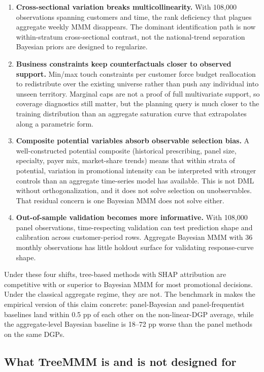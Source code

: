 \documentclass[review,12pt]{elsarticle}
\begin{document}
\begin{enumerate}
\item \textbf{Cross-sectional variation breaks multicollinearity.} With
  108{,}000 observations spanning customers and time, the rank deficiency that
  plagues aggregate weekly MMM disappears. The dominant identification path is
  now within-stratum cross-sectional contrast, not the national-trend separation
  Bayesian priors are designed to regularize.
\item \textbf{Business constraints keep counterfactuals closer to observed support.}
  Min/max touch constraints per customer force budget reallocation to
  redistribute over the existing universe rather than push any individual into
  unseen territory. Marginal caps are not a proof of full multivariate support,
  so coverage diagnostics still matter, but the planning query is much closer
  to the training distribution than an aggregate saturation curve that
  extrapolates along a parametric form.
\item \textbf{Composite potential variables absorb observable selection bias.}
  A well-constructed potential composite (historical prescribing, panel size,
  specialty, payer mix, market-share trends) means that within strata of
  potential, variation in promotional intensity can be interpreted with
  stronger controls than an aggregate time-series model has available. This is
  not DML without orthogonalization, and it does not solve selection on
  unobservables. That residual concern is one Bayesian MMM does not solve
  either.
\item \textbf{Out-of-sample validation becomes more informative.} With
  108{,}000 panel observations, time-respecting validation can test prediction
  shape and calibration across customer-period rows. Aggregate Bayesian MMM
  with 36 monthly observations has little holdout surface for validating
  response-curve shape.
\end{enumerate}

Under these four shifts, tree-based methods with SHAP attribution are
competitive with or superior to Bayesian MMM for most promotional decisions.
Under the classical aggregate regime, they are not. The benchmark in
 makes the empirical version of this claim concrete:
panel-Bayesian and panel-frequentist baselines land within 0.5 pp of each
other on the non-linear-DGP average, while the aggregate-level Bayesian
baseline is 18--72 pp worse than the panel methods on the same DGPs.

\subsection{What TreeMMM is and is not designed for}
\label{sec:intro:scope}
\end{document}
